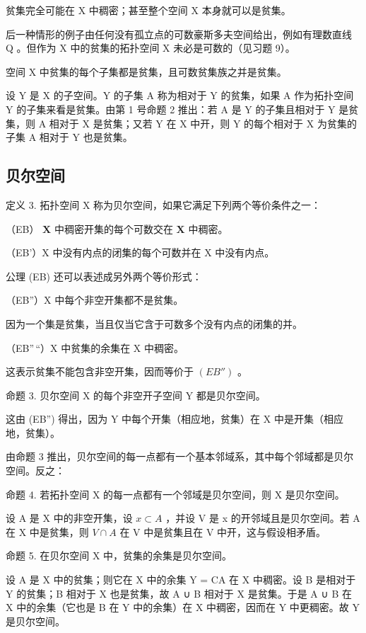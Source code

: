 贫集完全可能在 X 中稠密；甚至整个空间 X 本身就可以是贫集。

后一种情形的例子由任何没有孤立点的可数豪斯多夫空间给出，例如有理数直线 Q 。但作为 X 中的贫集的拓扑空间 X 未必是可数的（见习题 9）。

空间 X 中贫集的每个子集都是贫集，且可数贫集族之并是贫集。

设 Y 是 X 的子空间。Y 的子集 A 称为相对于 Y 的贫集，如果 A 作为拓扑空间 Y 的子集来看是贫集。由第 1 号命题 2 推出：若 A 是 Y 的子集且相对于 Y 是贫集，则 A 相对于 X 是贫集；又若 Y 在 X 中开，则 Y 的每个相对于 X 为贫集的子集 A 相对于 Y 也是贫集。

\subsection{贝尔空间}

定义 3. 拓扑空间 X 称为贝尔空间，如果它满足下列两个等价条件之一：

（EB） \(\mathbf{X}\) 中稠密开集的每个可数交在 \(\mathbf{X}\) 中稠密。

（EB'）X 中没有内点的闭集的每个可数并在 X 中没有内点。

公理 (EB) 还可以表述成另外两个等价形式：

（EB''）X 中每个非空开集都不是贫集。

因为一个集是贫集，当且仅当它含于可数多个没有内点的闭集的并。

（EB''\,``）X 中贫集的余集在 X 中稠密。

这表示贫集不能包含非空开集，因而等价于 \((EB'')\) 。

命题 3. 贝尔空间 X 的每个非空开子空间 Y 都是贝尔空间。

这由 (EB'') 得出，因为 Y 中每个开集（相应地，贫集）在 X 中是开集（相应地，贫集）。

由命题 3 推出，贝尔空间的每一点都有一个基本邻域系，其中每个邻域都是贝尔空间。反之：

命题 4. 若拓扑空间 X 的每一点都有一个邻域是贝尔空间，则 X 是贝尔空间。

设 A 是 X 中的非空开集，设 \(x \subset A\) ，并设 V 是 x 的开邻域且是贝尔空间。若 A 在 X 中是贫集，则 \(V \cap A\) 在 V 中是贫集且在 V 中开，这与假设相矛盾。

命题 5. 在贝尔空间 X 中，贫集的余集是贝尔空间。

设 A 是 X 中的贫集；则它在 X 中的余集 Y = CA 在 X 中稠密。设 B 是相对于 Y 的贫集；B 相对于 X 也是贫集，故 A ∪ B 相对于 X 是贫集。于是 A ∪ B 在 X 中的余集（它也是 B 在 Y 中的余集）在 X 中稠密，因而在 Y 中更稠密。故 Y 是贝尔空间。


